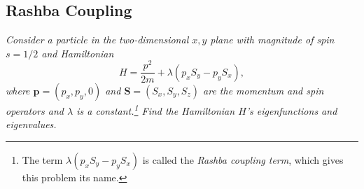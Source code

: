 \documentclass[11pt, a4paper]{article}
\renewcommand{\vec}[1]{\bm{#1}} %
\begin{document}
\subsection{Rashba Coupling}
\textit{Consider a particle in the two-dimensional $ x, y $ plane with magnitude of spin $ s = 1/2 $ and Hamiltonian}
\begin{equation*}
	H = \frac{p^{2}}{2m} + \lambda (p_{x}S_{y} - p_{y}S_{x}),
\end{equation*}
\textit{where $ \vec{p} = (p_{x}, p_{y}, 0) $ and $ \vec{S} = (S_{x}, S_{y}, S_{z}) $ are the momentum and spin operators and $ \lambda $ is a constant.\footnote{The term $ \lambda (p_{x}S_{y} - p_{y}S_{x}) $ is called the \textit{Rashba coupling term}, which gives this problem its name.} Find the Hamiltonian $ H $'s eigenfunctions and eigenvalues.}
\end{document}
